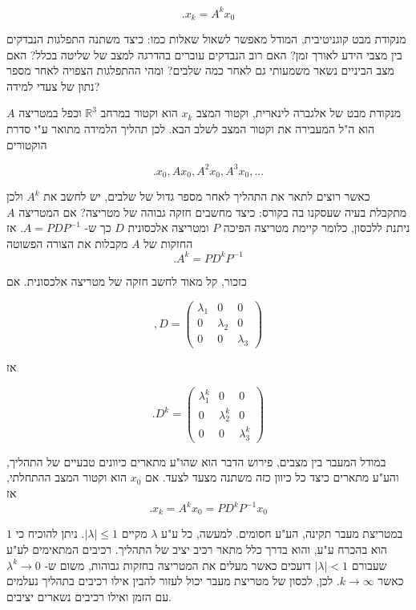 \documentclass[12pt]{report}
\theoremstyle{plain}
\theoremstyle{definition}
\newcommand{\R}{\mathbb{R}}
\newcommand{\0}{\mathbf{0}}
\begin{document}
$$
.x_k=A^k x_0
$$

מנקודת מבט קוגניטיבית, המודל מאפשר לשאול שאלות כמו:
כיצד משתנה התפלגות הנבדקים בין מצבי הידע לאורך זמן?
האם רוב הנבדקים עוברים בהדרגה למצב של שליטה בכלל?
האם מצב הביניים נשאר משמעותי גם לאחר כמה שלבים?
ומהי ההתפלגות הצפויה לאחר מספר נתון של צעדי למידה?

מנקודת מבט של אלגברה לינארית, וקטור המצב
$x_k$
הוא וקטור במרחב
$\R^3$
וכפל במטריצה
$A$
הוא ה"ל המעבירה את וקטור המצב לשלב הבא.
לכן תהליך הלמידה מתואר ע"י סדרת הוקטורים

$$
.x_0,Ax_0,A^2x_0,A^3x_0,...
$$

כאשר רוצים לתאר את התהליך לאחר מספר גדול של שלבים, יש לחשב את
$A^k$
ולכן מתקבלת בעיה שעסקנו בה בקורס: כיצד מחשבים חזקה גבוהה של מטריצה?
אם המטריצה
$A$
ניתנת ללכסון, כלומר קיימת מטריצה הפיכה
$P$
ומטריצה אלכסונית
$D$
כך ש-
$A=PDP^{-1}$.
אז החזקות של
$A$
מקבלות את הצורה הפשוטה
$$
.A^k = PD^kP^{-1}
$$

כזכור, קל מאוד לחשב חזקה של מטריצה אלכסונית. אם

$$
,D=
\begin{pmatrix}
\lambda_1 & 0 & 0\\
0 & \lambda_2 & 0\\
0 & 0 & \lambda_3
\end{pmatrix}
$$

אז

$$
.D^k=
\begin{pmatrix}
\lambda_1^k & 0 & 0\\
0 & \lambda_2^k & 0\\
0 & 0 & \lambda_3^k
\end{pmatrix}
$$

במודל המעבר בין מצבים, פירוש הדבר הוא שהו"ע מתארים כיוונים טבעיים של התהליך, והע"ע מתארים כיצד כל כיוון כזה משתנה מצעד לצעד. אם
$x_0$
הוא וקטור המצב ההתחלתי, אז
$$
.x_k=A^kx_0=PD^kP^{-1}x_0
$$

במטריצת מעבר תקינה, הע"ע חסומים. למעשה, כל ע"ע
$\lambda$
מקיים
$|\lambda|\leq 1$.
ניתן להוכיח כי 
$1$
הוא בהכרח ע"ע, והוא בדרך כלל מתאר רכיב יציב של התהליך.
רכיבים המתאימים לע"ע שעבורם
$|\lambda|<1$
דועכים כאשר מעלים את המטריצה בחזקות גבוהות, משום ש-
$\lambda^k \to 0$
כאשר
$k\to\infty$.
לכן, לכסון של מטריצת מעבר יכול לעזור להבין אילו רכיבים בתהליך נעלמים עם הזמן ואילו רכיבים נשארים יציבים.
\end{document}
